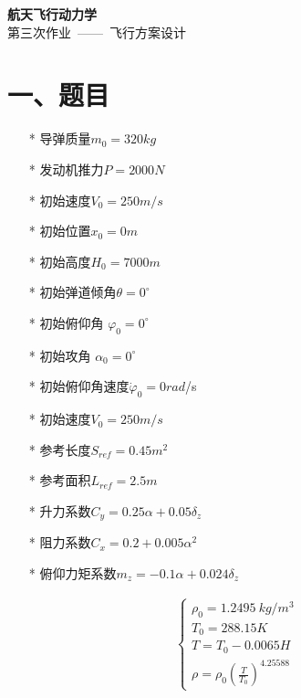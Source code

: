 \documentclass[UTF8]{ctexart}
\begin{document}
\begin{center}
    { \bf 航天飞行动力学}\\
    { 第三次作业\ ——\ 飞行方案设计}

\end{center}

\section*{ 一、题目}

\begin{itemize}
    \item[*] 导弹质量$m_0=320kg$
    \item[*] 发动机推力$P=2000N$
    \item[*] 初始速度$V_0=250m/s$
    \item[*] 初始位置$x_0=0m$
    \item[*] 初始高度$H_0=7000m$
    \item[*] 初始弹道倾角$\theta=0^{\circ}$
    \item[*] 初始俯仰角 $\varphi_0=0^\circ$
    \item[*] 初始攻角 $\alpha_0=0^\circ$
    \item[*] 初始俯仰角速度$\dot{\varphi}_0=0rad$/s
    \item[*] 初始速度$V_0=250m/s$
    \item[*] 参考长度$S_{ref}=0.45 m^{2}$
    \item[*] 参考面积$L_{ref}=2.5m$
    \item[*] 升力系数$C_{y}=0.25\alpha+0.05\delta_{z}$
    \item[*] 阻力系数$C_x=0.2+0.005\alpha^2$
    \item[*] 俯仰力矩系数$m_z=-0.1\alpha+0.024\delta_z$
\end{itemize}

\begin{align}
    \begin{cases}
        \rho_0=1.2495\ kg/m^3 \\
        T_0=288.15   K        \\
        T=T_0-0.0065H         \\
        \rho=\rho_{0}\left( \frac{T}{T_{0}} \right)^{4.25588}
    \end{cases}
\end{align}

\end{document}
